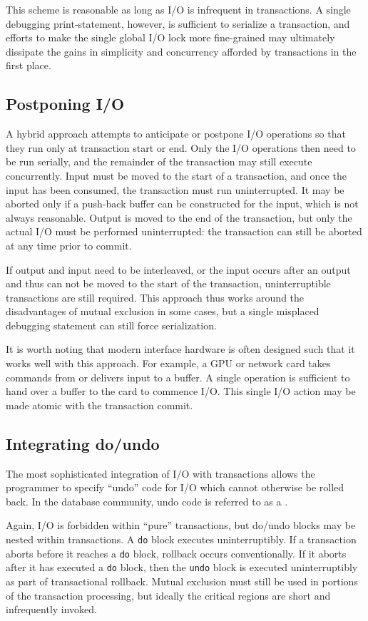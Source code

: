 This scheme is reasonable as long as I/O is infrequent in transactions.
A single debugging print-statement, however, is sufficient to
serialize a transaction, and efforts to make the single global I/O
lock more fine-grained may ultimately dissipate the gains in
simplicity and concurrency afforded by transactions in the first place.

\subsection{Postponing I/O}
A hybrid approach attempts to anticipate or postpone I/O operations so
that they run only at transaction start or end.
Only the I/O operations then need to be run serially, and the remainder of
the transaction may still execute concurrently.  Input must be moved
to the start of a transaction, and once the input has been consumed,
the transaction must run uninterrupted.  It may be aborted
only if a push-back buffer can be constructed for the input, which is
not always reasonable.  Output is moved to the end of the transaction,
but only the actual I/O must be performed uninterrupted: the
transaction can still be aborted at any time prior to commit.

If output and input need to be interleaved, or the input occurs after
an output and thus can not be moved to the start of the transaction,
uninterruptible transactions are still required.  This approach thus
works around the disadvantages of mutual exclusion in some cases, but
a single misplaced debugging statement can still force serialization.

It is worth noting that modern interface hardware is often designed
such that it works well with this approach.  For example, a GPU
or network card takes commands from or delivers input to a
buffer.  A single operation is sufficient to hand over a buffer to
the card to commence I/O\@.  This single I/O action may be made atomic
with the transaction commit.

\subsection{Integrating do/undo}
The most sophisticated integration of I/O with transactions allows the
programmer to specify ``undo'' code for I/O which cannot otherwise be
rolled back.  In the database community, undo code is referred to as a
.

Again, I/O is forbidden within ``pure'' transactions, but
do/undo blocks may be nested within transactions.  A \texttt{do} block
executes uninterruptibly.  If a transaction aborts before it reaches a
\texttt{do} block, rollback occurs conventionally.  If it aborts after it
has executed a \texttt{do} block, then the \texttt{undo} block is
executed uninterruptibly as part of transactional rollback.
Mutual exclusion must still be used in portions of the transaction
processing, but ideally the critical regions are short and infrequently
invoked.


